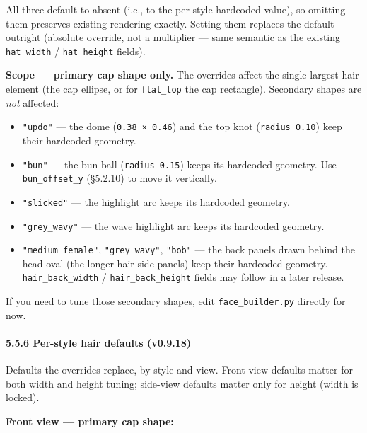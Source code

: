 \documentclass[
  11pt,
]{book}
\providecommand{\tightlist}{%
  \setlength{\itemsep}{0pt}\setlength{\parskip}{0pt}}
\begin{document}
All three default to absent (i.e., to the per-style hardcoded value), so
omitting them preserves existing rendering exactly. Setting them
replaces the default outright (absolute override, not a multiplier ---
same semantic as the existing \texttt{hat\_width} / \texttt{hat\_height}
fields).

\textbf{Scope --- primary cap shape only.} The overrides affect the
single largest hair element (the cap ellipse, or for \texttt{flat\_top}
the cap rectangle). Secondary shapes are \emph{not} affected:

\begin{itemize}
\tightlist
\item
  \texttt{"updo"} --- the dome (\texttt{0.38\ ×\ 0.46}) and the top knot
  (\texttt{radius\ 0.10}) keep their hardcoded geometry.
\item
  \texttt{"bun"} --- the bun ball (\texttt{radius\ 0.15}) keeps its
  hardcoded geometry. Use \texttt{bun\_offset\_y} (§5.2.10) to move it
  vertically.
\item
  \texttt{"slicked"} --- the highlight arc keeps its hardcoded geometry.
\item
  \texttt{"grey\_wavy"} --- the wave highlight arc keeps its hardcoded
  geometry.
\item
  \texttt{"medium\_female"}, \texttt{"grey\_wavy"}, \texttt{"bob"} --- the
  back panels drawn behind the head oval (the longer-hair side panels)
  keep their hardcoded geometry. \texttt{hair\_back\_width} /
  \texttt{hair\_back\_height} fields may follow in a later release.
\end{itemize}

If you need to tune those secondary shapes, edit
\texttt{face\_builder.py} directly for now.

\paragraph{\texorpdfstring{5.5.6 Per-style hair defaults
(v0.9.18)}{5.5.6 Per-style hair defaults (v0.9.18)}}\label{per-style-hair-defaults}

Defaults the overrides replace, by style and view. Front-view defaults
matter for both width and height tuning; side-view defaults matter only
for height (width is locked).

\textbf{Front view --- primary cap shape:}
\end{document}
